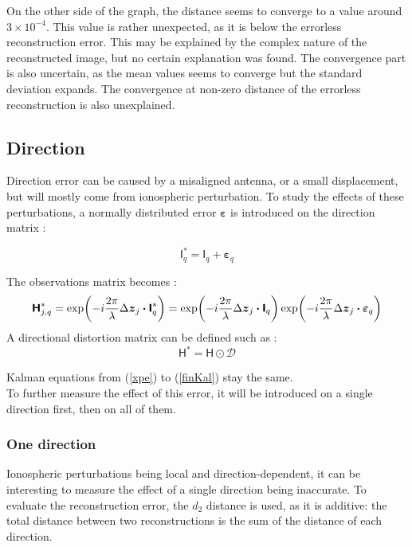 \documentclass[titlepage]{article}
\renewcommand{\H}{\boldsymbol{\mathsf{H}}}
\newcommand{\I}{\boldsymbol{\mathsf{I}}}
\newcommand{\dz}{\Delta\boldsymbol{z}}
\newcommand{\vbeps}{\boldsymbol{\varepsilon}}
\newcommand{\D}{\mathcal{D}}
\begin{document}
	On the other side of the graph, the distance seems to converge to a value around $3\times10^{-4}$. This value is rather unexpected, as it is below the errorless reconstruction error. This may be explained by the complex nature of the reconstructed image, but no certain explanation was found. The convergence part is also uncertain, as the mean values seems to converge but the standard deviation expands. The convergence at non-zero distance of the errorless reconstruction is also unexplained.
	
	\subsection{Direction}
	
	Direction error can be caused by a misaligned antenna, or a small displacement, but will mostly come from ionospheric perturbation\cite{iono}. To study the effects of these perturbations, a normally distributed error $\vbeps$ is introduced on the direction matrix :
	
	\begin{equation}
		\I_q^* = \I_q + \vbeps_q
	\end{equation}

	The observations matrix becomes :
	$$
		\H_{j,q}^* = \exp(-i\frac{2\pi}{\lambda}\dz_{j}\dotproduct\I_q^*) = \exp(-i\frac{2\pi}{\lambda}\dz_{j}\dotproduct\I_q)\exp(-i\frac{2\pi}{\lambda}\dz_{j}\dotproduct\vbeps_q)
	$$
	A directional distortion matrix can be defined such as :
	\begin{equation}
		\H^* = \H \odot \D
	\end{equation}

	Kalman equations from (\ref{xpe}) to (\ref{finKal}) stay the same.\\
	
	To further measure the effect of this error, it will be introduced on a single direction first, then on all of them. 
	
	\subsubsection{One direction}
	
	Ionospheric perturbations being local and direction-dependent, it can be interesting to measure the effect of a single direction being inaccurate. To evaluate the reconstruction error, the $d_2$ distance is used, as it is additive: the total distance between two reconstructions is the sum of the distance of each direction.
	
\end{document}
